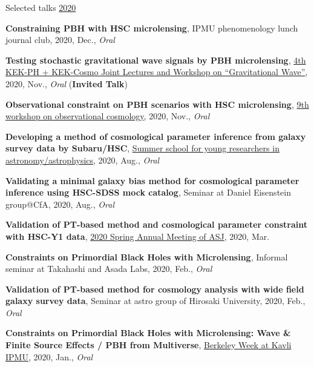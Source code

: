 \begin{rSection}{Selected talks}
\underline{2020}
\begin{etaremune}
\setcounter{enumi}{16}
\item \textbf{Constraining PBH with HSC microlensing}, IPMU phenomenology lunch journal club, 2020, Dec., \textit{Oral}
\item \textbf{Testing stochastic gravitational wave signals by PBH microlensing}, \href{http://conference-indico.kek.jp/event/117/timetable/#day-2020-11-04}{4th KEK-PH + KEK-Cosmo Joint Lectures and Workshop on ``Gravitational Wave''}, 2020, Nov., \textit{Oral} (\textbf{Invited Talk})
\item \textbf{Observational constraint on PBH scenarios with HSC microlensing}, \href{https://indico.ipmu.jp/event/382/timetable/#all}{9th workshop on observational cosmology}, 2020, Nov., \textit{Oral}
\item \textbf{Developing a method of cosmological parameter inference from galaxy survey data by Subaru/HSC}, \href{http://www.astro-wakate.org/ss2019/web/}{Summer school for young researchers in astronomy/astrophysics}, 2020, Aug., \textit{Oral}
\item \textbf{Validating a minimal galaxy bias method for cosmological parameter inference using HSC-SDSS mock catalog}, Seminar at Daniel Eisenstein group@CfA, 2020, Aug., \textit{Oral}
\item \textbf{Validation of PT-based method and cosmological parameter constraint with HSC-Y1 data}, \href{http://www.asj.or.jp/nenkai/archive/2020a/pdf/U03a.pdf}{2020 Spring Annual Meeting of ASJ}, 2020, Mar.
\item \textbf{Constraints on Primordial Black Holes with Microlensing}, Informal seminar at Takahashi and Asada Labs, 2020, Feb., \textit{Oral}
\item \textbf{Validation of PT-based method for cosmology analysis with wide field galaxy survey data}, Seminar at astro group of Hirosaki University, 2020, Feb., \textit{Oral}
\item \textbf{Constraints on Primordial Black Holes with Microlensing: Wave \& Finite Source Effects / PBH from Multiverse}, \href{http://indico.ipmu.jp/event/313/overview}{Berkeley Week at Kavli IPMU}, 2020, Jan., \textit{Oral}
\end{etaremune}


\end{rSection}
